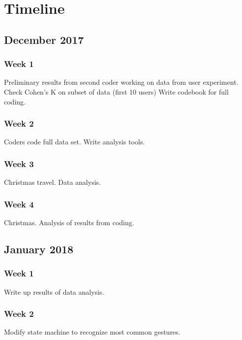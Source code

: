 \chapter{Timeline}

\section{December 2017}

\subsection{Week 1}

Preliminary results from second coder working on data from user experiment. 
Check Cohen's K on subset of data (first 10 users)
Write codebook for full coding. 

\subsection{Week 2}

Coders code full data set.
Write analysis tools. 

\subsection{Week 3}

Christmas travel. 
Data analysis.

\subsection{Week 4}

Christmas. 
Analysis of results from coding.

\section{January 2018}

\subsection{Week 1}

Write up results of data analysis.

\subsection{Week 2}

Modify state machine to recognize most common gestures. 

